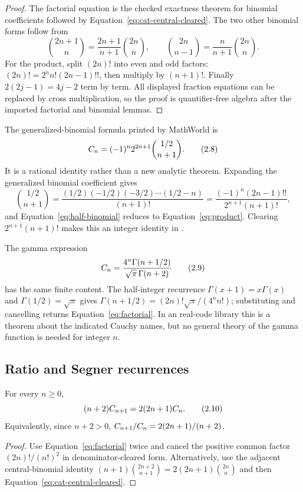 \begin{proof}
The factorial equation is the checked exactness theorem for binomial
coefficients followed by Equation~\eqref{eq:cat-central-cleared}.  The two
other binomial forms follow from
\[
 \binom{2n+1}{n}=\frac{2n+1}{n+1}\binom{2n}{n},\qquad
 \binom{2n}{n-1}=\frac n{n+1}\binom{2n}{n}.
\]
For the product, split $(2n)!$ into even and odd factors:
$(2n)!=2^n n!(2n-1)!!$, then multiply by $(n+1)!$.  Finally
$2(2j-1)=4j-2$ term by term.  All displayed fraction equations can be
replaced by cross multiplication, so the proof is quantifier-free algebra
after the imported factorial and binomial lemmas.
\end{proof}

The generalized-binomial formula printed by MathWorld is
\[
 C_n=(-1)^n2^{2n+1}\binom{1/2}{n+1}.                          \tag{2.8}\label{eq:half-binomial}
\]
It is a rational identity rather than a new analytic theorem.  Expanding the
generalized binomial coefficient gives
\[
 \binom{1/2}{n+1}
  =\frac{(1/2)(-1/2)(-3/2)\cdots(1/2-n)}{(n+1)!}
  =\frac{(-1)^n(2n-1)!!}{2^{n+1}(n+1)!},
\]
and Equation~\eqref{eq:half-binomial} reduces to
Equation~\eqref{eq:product}.  Clearing $2^{n+1}(n+1)!$ makes this an integer
identity in \ipra.

The gamma expression
\[
 C_n=\frac{4^n\Gamma(n+1/2)}{\sqrt\pi\,\Gamma(n+2)}             \tag{2.9}\label{eq:gamma}
\]
has the same finite content.  The half-integer recurrence
$\Gamma(x+1)=x\Gamma(x)$ and $\Gamma(1/2)=\sqrt\pi$ gives
\(\Gamma(n+1/2)=(2n)!\sqrt\pi/(4^n n!)\); substituting and cancelling
returns Equation~\eqref{eq:factorial}.  In an \ipra{} real-code library this is
a theorem about the indicated Cauchy names, but no general theory of the gamma
function is needed for integer $n$.

\subsection{Ratio and Segner recurrences}

\begin{theorem}
\label{thm:ratio-recurrence}
For every $n\ge0$,
\[
 (n+2)C_{n+1}=2(2n+1)C_n.                                  \tag{2.10}\label{eq:ratio-cleared}
\]
Equivalently, since $n+2>0$,
\(C_{n+1}/C_n=2(2n+1)/(n+2)\).
\end{theorem}

\begin{proof}
Use Equation~\eqref{eq:factorial} twice and cancel the positive common factor
$(2n)!/(n!)^2$ in denominator-cleared form.  Alternatively, use the adjacent
central-binomial identity
$(n+1)\binom{2n+2}{n+1}=2(2n+1)\binom{2n}{n}$ and then
Equation~\eqref{eq:cat-central-cleared}.
\end{proof}

